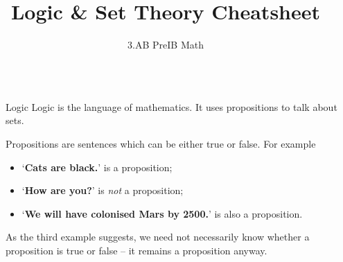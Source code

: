 \documentclass[final]{beamer}
\title{Logic \& Set Theory Cheatsheet}
\author{3.AB PreIB Math}
\institute[shortinst]{Adam Klepáč}
\newlength{\sepwidth}
\newlength{\colwidth}
\newcommand{\separatorcolumn}{\begin{column}{\sepwidth}\end{column}}
\begin{document}

\begin{frame}[t]
\begin{columns}[t]
\separatorcolumn

\begin{column}{\colwidth}

 \begin{block}{Logic}
  \alert{Logic} is the language of mathematics. It uses \alert{propositions} to
  talk about sets.

  Propositions are sentences which can be either true or false. For example
  \begin{itemize}[label=\textbullet,left=24pt]
   \item `\textbf{Cats are black.}' is a proposition;
   \item `\textbf{How are you?}' is \emph{not} a proposition;
   \item `\textbf{We will have colonised Mars by 2500.}' is also a proposition.
  \end{itemize}
 \end{block}
 As the third example suggests, we need not necessarily know whether a
 proposition is true or false -- it remains a proposition anyway.

 \vspace{1em}


\end{column}
\end{columns}
\end{frame}
\end{document}
